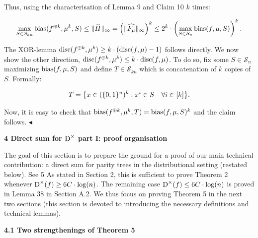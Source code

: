 Thus, using the characterisation of Lemma 9 and Claim 10 $k$ times:\par


\[\begin{gathered}
\max_{S\in\mathcal{S}_{kn}}{\textup{bias}}(f^{\oplus k},\mu^{k},S)\leq\|\widehat{H}\|_{\infty}=\left(\|\widehat{F_{\mu}}\|_{\infty}\right)^{k}\leq 2^{k}\cdot\left(\max_{S\in\mathcal{S}_{n}}{\textup{bias}}(f,\mu,S)\right)^{k}.
\end{gathered}\]


The XOR-lemma ${\textup{disc}}(f^{\oplus k},\mu^{k})\geq k\cdot({\textup{disc}}(f,\mu)-1)$ follows directly. We now show the other direction, ${\textup{disc}}(f^{\oplus k},\mu^{k})\leq k\cdot{\textup{disc}}(f,\mu)$. To do so, fix some $S\in\mathcal{S}_{n}$ maximizing ${\textup{bias}}(f,\mu,S)$ and define $T\in\mathcal{S}_{kn}$ which is concatenation of $k$ copies of $S$. Formally:\par


\[\begin{gathered}
T=\big{\{}x\in(\{0,1\}^{n})^{k}:x^{i}\in S\quad\forall i\in[k]\big{\}}.
\end{gathered}\]


Now, it is easy to check that ${\textup{bias}}(f^{\oplus k},\mu^{k},T)={\textup{bias}}(f,\mu,S)^{k}$ and the claim follows.
$\blacktriangleleft$\par







\par\medskip\noindent\textbf{
4 Direct sum for ${\textup{D}}^{\times}$ part I: proof organisation}\par




The goal of this section is to prepare the ground for a proof of our main technical contribution: a direct sum for parity trees in the distributional setting (restated below).
See 5
As stated in Section 2, this is sufficient to prove Theorem 2 whenever ${\textup{D}}^{\times}(f)\geq 6C\cdot\log(n)$. The remaining case ${\textup{D}}^{\times}(f)\leq 6C\cdot\log(n)$ is proved in Lemma 38 in Section A.2. We thus focus on proving Theorem 5 in the next two sections (this section is devoted to introducing the necessary definitions and technical lemmas).\par




\par\medskip\noindent\textbf{
4.1 Two strengthenings of Theorem 5
}\par




